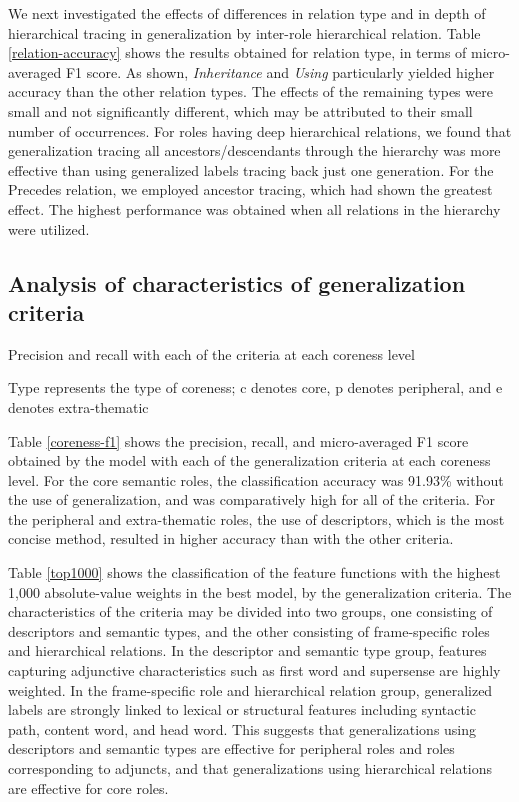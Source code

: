 \documentclass[english]{jnlp_1.4_rep}
\begin{document}
We next investigated the effects of differences in relation type and in depth of hierarchical tracing in generalization by inter-role hierarchical relation. Table \ref{relation-accuracy} shows the results obtained for relation type, in terms of micro-averaged F1 score. As shown, {\it Inheritance} and {\it Using} particularly yielded higher accuracy than the other relation types. The effects of the remaining types were small and not significantly different, which may be attributed to their small number of occurrences. For roles having deep hierarchical relations, we found that generalization tracing all ancestors/descendants through the hierarchy was more effective than using generalized labels tracing back just one generation. For the Precedes relation, we employed ancestor tracing, which had shown the greatest effect. The highest performance was obtained when all relations in the hierarchy were utilized.


\subsection{Analysis of characteristics of generalization criteria}

\begin{table}[b]
\caption{Precision and recall with each of the criteria at each coreness level}
\label{coreness-f1}

\vspace{4pt}\small
Type represents the type of coreness; c denotes core, p denotes peripheral, and e denotes extra-thematic
\par
\end{table}

Table \ref{coreness-f1} shows the precision, recall, and micro-averaged F1 score obtained by the model with each of the generalization criteria at each coreness level. For the core semantic roles, the classification accuracy was 91.93\% without the use of generalization, and was comparatively high for all of the criteria. For the peripheral and extra-thematic roles, the use of descriptors, which is the most concise method, resulted in higher accuracy than with the other criteria.

Table \ref{top1000} shows the classification of the feature functions with the highest 1,000 absolute-value weights in the best model, by the generalization criteria. The characteristics of the criteria may be divided into two groups, one consisting of descriptors and semantic types, and the other consisting of frame-specific roles and hierarchical relations. In the descriptor and semantic type group, features capturing adjunctive characteristics such as first word and supersense are highly weighted. In the frame-specific role and hierarchical relation group, generalized labels are strongly linked to lexical or structural features including syntactic path, content word, and head word. This suggests that generalizations using descriptors and semantic types are effective for peripheral roles and roles corresponding to adjuncts, and that generalizations using hierarchical relations are effective for core roles.
\end{document}
